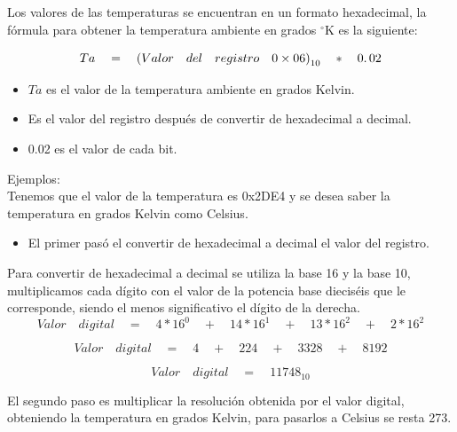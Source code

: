 Los valores de las temperaturas se encuentran en un formato hexadecimal, la fórmula para obtener la temperatura ambiente en grados $^{\circ}$K es la siguiente:

\begin{equation}
	Ta \quad = \quad {(Valor \quad del \quad registro \quad 0\times06)}_{10} \quad \ast \quad 0\ldotp02
\end{equation}

\begin{itemize}
	\item $Ta$ es el valor de la temperatura ambiente en grados Kelvin.
	\item Es el valor del registro después de convertir de hexadecimal a decimal.
	\item 0.02 es el valor de cada bit.
\end{itemize}

Ejemplos: \\

Tenemos que el valor de la temperatura es 0x2DE4 y se desea saber la temperatura en grados Kelvin como Celsius. \\

\begin{itemize}
	\item El primer pasó el convertir de hexadecimal a decimal el valor del registro.
\end{itemize}

Para convertir de hexadecimal a decimal se utiliza la base 16 y la base 10, multiplicamos cada dígito con el valor de la potencia base dieciséis que le corresponde, siendo el menos significativo el dígito de la derecha. \\

\begin{equation}
Valor \quad digital \quad = \quad 4\ast16^0 \quad + \quad 14\ast16^1 \quad + \quad 13\ast16^2 \quad + \quad 2\ast16^2 
\end{equation}

\begin{equation}
Valor \quad digital \quad = \quad 4 \quad + \quad 224 \quad + \quad 3328 \quad + \quad 8192 
\end{equation}

\begin{equation}
Valor \quad digital \quad = \quad {11748}_{10}  
\end{equation}

El segundo paso es multiplicar la resolución obtenida por el valor digital, obteniendo la temperatura en grados Kelvin, para pasarlos a Celsius se resta 273. \\

